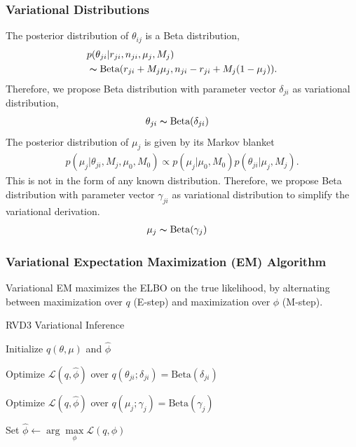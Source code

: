 \documentclass[11pt,reqno]{amsart}
\begin{document}
\subsubsection{Variational Distributions}
The posterior distribution of $\theta_{ij}$ is a Beta distribution,
\begin{align}
&p(\theta_{ji}|r_{ji},n_{ji},\mu_j,M_j)\\
&\thicksim \text{Beta}(r_{ji}+M_j \mu_j, n_{ji}-r_{ji}+M_j(1-\mu_j)).
\end{align}
Therefore, we propose Beta distribution with parameter vector $\delta_{ji}$ as variational distribution,
\begin{align}
\theta_{ji} &\thicksim \text{Beta}(\delta_{ji}) \nonumber
\end{align}
%
The posterior distribution of $\mu_j$ is given by its Markov blanket
\begin{align}
p(\mu_j|\theta_{ji},M_j,\mu_0,M_0)\propto p(\mu_j|\mu_0,M_0)p(\theta_{ji}|\mu_j,M_j).
\end{align}
This is not in the form of any known distribution. Therefore, we propose Beta distribution with parameter vector $\gamma_{ji}$ as variational distribution to simplify the variational derivation.
\begin{align}
\mu_j &\thicksim \text{Beta}(\gamma_j) \nonumber
\end{align}

\subsubsection{Variational Expectation Maximization (EM) Algorithm}
Variational EM maximizes the ELBO on the true likelihood, by alternating between maximization over $q$ (E-step) and maximization over $\phi$ (M-step).

\begin{algorithm}[h]
  \caption{RVD3 Variational Inference}

  \begin{algorithmic}[1]

  \State Initialize $ q(\theta, \mu) $ and $\hat{\phi}$

  \Repeat

	\Repeat
	
			\State Optimize $\mathcal{L}(q, \hat{\phi})$ over $q(\theta_{ji}; \delta_{ji}) = \text{Beta} (\delta_{ji})$				
			\EndFor			
		\EndFor
	
			\State Optimize $\mathcal{L}(q, \hat{\phi})$ over $q(\mu_j; \gamma_j) = \text{Beta} (\gamma_j)$			
		\EndFor
	

  \State Set $\hat{\phi} \leftarrow \arg \max\limits_{\phi}
            \mathcal{L}(q,\phi)$

  \end{algorithmic}

\end{algorithm}
\end{document}
